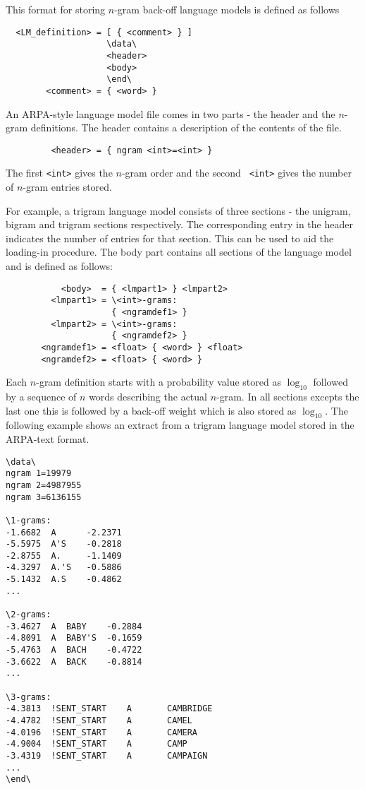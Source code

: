 This format for storing $n$-gram back-off language models is defined
as follows
\begin{verbatim}
  <LM_definition> = [ { <comment> } ] 
                    \data\ 
                    <header> 
                    <body> 
                    \end\
        <comment> = { <word> }
\end{verbatim}
An ARPA-style language model file comes in two parts - the header and
the $n$-gram definitions. The header contains a description of the
contents of the file.
\begin{verbatim}
         <header> = { ngram <int>=<int> }
\end{verbatim}
The first {\tt <int>} gives the $n$-gram order and the second {\tt
<int>} gives the number of $n$-gram entries stored.

For example, a trigram language model consists of three sections - the
unigram, bigram and trigram sections respectively. The corresponding
entry in the header indicates the number of entries for that
section. This can be used to aid the loading-in procedure. The body
part contains all sections of the language model and is defined as
follows:
\begin{verbatim}
           <body>  = { <lmpart1> } <lmpart2>
         <lmpart1> = \<int>-grams: 
                     { <ngramdef1> }
         <lmpart2> = \<int>-grams: 
                     { <ngramdef2> }
       <ngramdef1> = <float> { <word> } <float>
       <ngramdef2> = <float> { <word> } 
\end{verbatim}
Each $n$-gram definition starts with a probability value stored as
$\log_{10}$ followed by a sequence of $n$ words describing the actual
$n$-gram. In all sections excepts the last one this is followed by a
back-off weight which is also stored as $\log_{10}$. The following
example shows an extract from a trigram language model stored in the
ARPA-text format.

\begin{verbatim}
\data\
ngram 1=19979
ngram 2=4987955
ngram 3=6136155

\1-grams:
-1.6682  A      -2.2371
-5.5975  A'S    -0.2818
-2.8755  A.     -1.1409
-4.3297  A.'S   -0.5886
-5.1432  A.S    -0.4862
...

\2-grams:
-3.4627  A  BABY    -0.2884
-4.8091  A  BABY'S  -0.1659
-5.4763  A  BACH    -0.4722
-3.6622  A  BACK    -0.8814
...

\3-grams:
-4.3813  !SENT_START    A       CAMBRIDGE
-4.4782  !SENT_START    A       CAMEL
-4.0196  !SENT_START    A       CAMERA
-4.9004  !SENT_START    A       CAMP
-3.4319  !SENT_START    A       CAMPAIGN
...
\end\
\end{verbatim}


